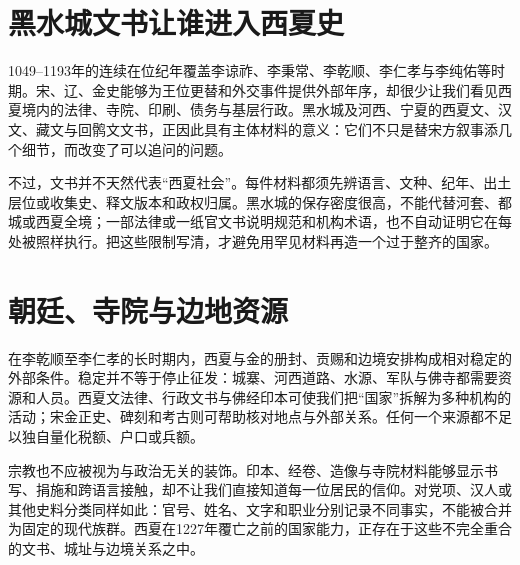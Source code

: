 \section{黑水城文书让谁进入西夏史}

1049--1193年的连续在位纪年覆盖李谅祚、李秉常、李乾顺、李仁孝与李纯佑等时期。宋、辽、金史能够为王位更替和外交事件提供外部年序，却很少让我们看见西夏境内的法律、寺院、印刷、债务与基层行政。黑水城及河西、宁夏的西夏文、汉文、藏文与回鹘文文书，正因此具有主体材料的意义：它们不只是替宋方叙事添几个细节，而改变了可以追问的问题。

不过，文书并不天然代表“西夏社会”。每件材料都须先辨语言、文种、纪年、出土层位或收集史、释文版本和政权归属。黑水城的保存密度很高，不能代替河套、都城或西夏全境；一部法律或一纸官文书说明规范和机构术语，也不自动证明它在每处被照样执行。把这些限制写清，才避免用罕见材料再造一个过于整齐的国家。

\section{朝廷、寺院与边地资源}

在李乾顺至李仁孝的长时期内，西夏与金的册封、贡赐和边境安排构成相对稳定的外部条件。稳定并不等于停止征发：城寨、河西道路、水源、军队与佛寺都需要资源和人员。西夏文法律、行政文书与佛经印本可使我们把“国家”拆解为多种机构的活动；宋金正史、碑刻和考古则可帮助核对地点与外部关系。任何一个来源都不足以独自量化税额、户口或兵额。

宗教也不应被视为与政治无关的装饰。印本、经卷、造像与寺院材料能够显示书写、捐施和跨语言接触，却不让我们直接知道每一位居民的信仰。对党项、汉人或其他史料分类同样如此：官号、姓名、文字和职业分别记录不同事实，不能被合并为固定的现代族群。西夏在1227年覆亡之前的国家能力，正存在于这些不完全重合的文书、城址与边境关系之中。
